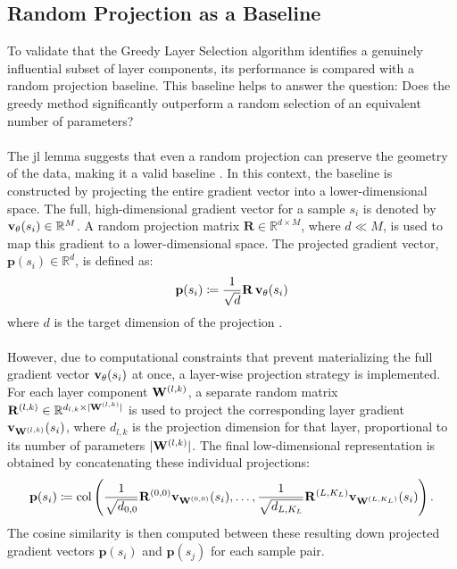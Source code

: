 \subsection{Random Projection as a Baseline}\label{subsec:random_projection_as_a_baseline}
To validate that the Greedy Layer Selection algorithm identifies a genuinely influential subset of layer components, its performance is compared with a random projection baseline. This baseline helps to answer the question: Does the greedy method significantly outperform a random selection of an equivalent number of parameters?
\\\\
The \acrfull{jl} lemma suggests that even a random projection can preserve the geometry of the data, making it a valid baseline \cite{johnson_lindenstrauss}. In this context, the baseline is constructed by projecting the entire gradient vector into a lower-dimensional space. The full, high-dimensional gradient vector for a sample $s_i$ is denoted by $\vXsi[\theta] \in \mathbb{R}^M$. A random projection matrix $\mathbf{R} \in \mathbb{R}^{d \times M}$, where $d \ll M$, is used to map this gradient to a lower-dimensional space. The projected gradient vector, $\mathbf{p}(s_i) \in \mathbb{R}^d$, is defined as:
\begin{equation}
    \mathbf{p}(s_i) \coloneqq \frac{1}{\sqrt{d}} \mathbf{R} \, \vXsi[\theta]
\end{equation}
where $d$ is the target dimension of the projection \cite{DBLP:journals/corr/abs-2110-13970}.
\\\\
However, due to computational constraints that prevent materializing the full gradient vector $\vXsi[\theta]$ at once, a layer-wise projection strategy is implemented. For each layer component $\Wlk$, a separate random matrix $\mathbf{R}^{(l,k)} \in \mathbb{R}^{d_{l,k} \times |\Wlk|}$ is used to project the corresponding layer gradient $\vXsi[\Wlk]$, where $d_{l,k}$ is the projection dimension for that layer, proportional to its number of parameters $|\Wlk|$. The final low-dimensional representation is obtained by concatenating these individual projections:
\begin{equation}
    \mathbf{p}(s_i) \coloneqq \operatorname{col}\left( \frac{1}{\sqrt{d_{0,0}}} \mathbf{R}^{(0,0)} \vXsi[\W^{(0,0)}], \dots, \frac{1}{\sqrt{d_{L,K_L}}} \mathbf{R}^{(L,K_L)} \vXsi[\W^{(L,K_L)}] \right).
\end{equation}
The cosine similarity is then computed between these resulting down projected gradient vectors $\mathbf{p}(s_i)$ and $\mathbf{p}(s_j)$ for each sample pair.
